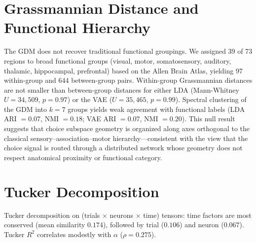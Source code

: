 \documentclass{article}
\begin{document}
\section{Grassmannian Distance and Functional Hierarchy}
\label{app:gdm_hierarchy}

The GDM does not recover traditional functional groupings. We assigned 39 of 73 regions to broad functional groups (visual, motor, somatosensory, auditory, thalamic, hippocampal, prefrontal) based on the Allen Brain Atlas, yielding 97 within-group and 644 between-group pairs. Within-group Grassmannian distances are not smaller than between-group distances for either LDA (Mann-Whitney $U = 34{,}509$, $p = 0.97$) or the VAE ($U = 35{,}465$, $p = 0.99$). Spectral clustering of the GDM into $k = 7$ groups yields weak agreement with functional labels (LDA ARI $= 0.07$, NMI $= 0.18$; VAE ARI $= 0.07$, NMI $= 0.20$). This null result suggests that choice subspace geometry is organized along axes orthogonal to the classical sensory--association--motor hierarchy---consistent with the view that the choice signal is routed through a distributed network whose geometry does not respect anatomical proximity or functional category.

\section{Tucker Decomposition}
\label{app:tucker}

Tucker decomposition on (trials $\times$ neurons $\times$ time) tensors: time factors are most conserved (mean similarity $0.174$), followed by trial ($0.106$) and neuron ($0.067$). Tucker $R^2$ correlates modestly with $\alpha$ ($\rho = 0.275$).
\end{document}
